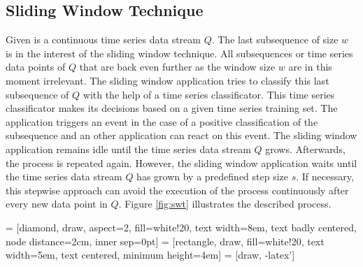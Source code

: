 \subsection{Sliding Window Technique} \label{sliding_window_technique}
Given is a continuous time series data stream $Q$. The last subsequence of size $w$ is in the interest of the sliding
window technique. All subsequences or time series data points of $Q$ that are back even further as the window size $w$
are in this moment irrelevant. The sliding window application tries to classify this last subsequence of $Q$ with the
help of a time series classificator. This time series classificator makes its decisions based on a given time series
training set. The application triggers an event in the case of a positive classification of the subsequence and an other
application can react on this event. The sliding window application remains idle until the time series data stream $Q$
grows. Afterwards, the process is repeated again. However, the sliding window application waits until the time series
data stream $Q$ has grown by a predefined step size $s$. If necessary, this stepwise approach can avoid the execution of
the process continuously after every new data point in $Q$. Figure \ref{fig:swt} illustrates the described process.

 = [diamond, draw, aspect=2, fill=white!20, text width=8em, text badly centered, node distance=2cm, inner sep=0pt]
 = [rectangle, draw, fill=white!20, text width=5em, text centered, minimum height=4em]
 = [draw, -latex']

